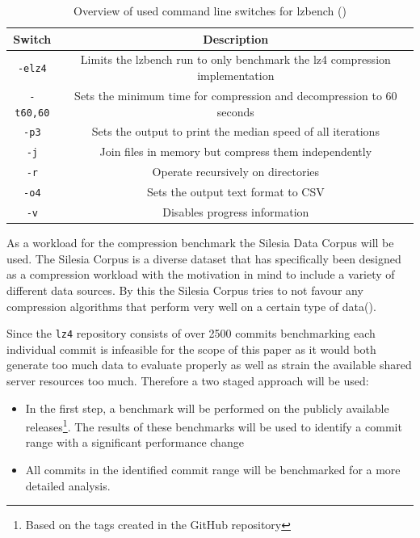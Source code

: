 \documentclass[	runningheads,
				a4paper]{llncs}
\begin{document}
	\begin{table}
		\caption{Overview of used command line switches for lzbench (\cite{gitlzbench})}
		\label{tab:cmd_switches}
		\centering
		\begin{tabular}{|c|c|}
			\hline
			\textbf{Switch} & \textbf{Description}\\
			\hline\hline
			\texttt{-elz4} & Limits the lzbench run to only benchmark the lz4 compression implementation \\
			\hline
			\texttt{-t60,60} & Sets the minimum time for compression and decompression to $60$ seconds \\
			\hline
			\texttt{-p3} & Sets the output to print the median speed of all iterations \\
			\hline
			\texttt{-j} & Join files in memory but compress them independently \\
			\hline
			\texttt{-r} & Operate recursively on directories \\
			\hline 
			\texttt{-o4} & Sets the output text format to CSV \\
			\hline
			\texttt{-v} & Disables progress information \\
			\hline
		\end{tabular}
	\end{table}
	
	As a workload for the compression benchmark the Silesia Data Corpus will be used. The Silesia Corpus is a diverse dataset that has specifically been designed as a compression workload with the motivation in mind to include a variety of different data sources. By this the Silesia Corpus tries to not favour any compression algorithms that perform very well on a certain type of data(\cite{silesia}).

	Since the \texttt{lz4} repository consists of over 2500 commits benchmarking each individual commit is infeasible for the scope of this paper as it would both generate too much data to evaluate properly as well as strain the available shared server resources too much. Therefore a two staged approach will be used:
\begin{itemize}
	\item In the first step, a benchmark will be performed on the publicly available releases\footnote{Based on the tags created in the GitHub repository}. The results of these benchmarks will be used to identify a commit range with a significant performance change
	\item All commits in the identified commit range will be benchmarked for a more detailed analysis.
\end{itemize}
\end{document}
